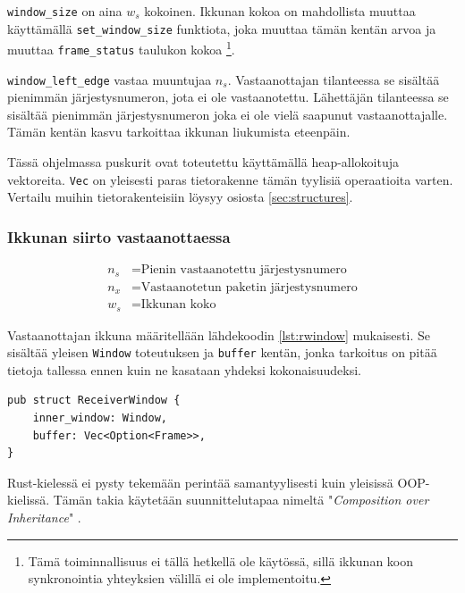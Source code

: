 \documentclass[a4paper,12pt]{article}
\begin{document}
\lstinline{window_size} on aina $w_s$ kokoinen. Ikkunan kokoa on mahdollista muuttaa käyttämällä \lstinline{set_window_size} funktiota, joka muuttaa tämän kentän arvoa ja muuttaa \lstinline{frame_status} taulukon kokoa \footnote{Tämä toiminnallisuus ei tällä hetkellä ole käytössä, sillä ikkunan koon synkronointia yhteyksien välillä ei ole implementoitu.}.\par

\lstinline{window_left_edge} vastaa muuntujaa $n_s$. Vastaanottajan tilanteessa se sisältää pienimmän järjestysnumeron, jota ei ole vastaanotettu. Lähettäjän tilanteessa se sisältää pienimmän järjestysnumeron joka ei ole vielä saapunut vastaanottajalle. Tämän kentän kasvu tarkoittaa ikkunan liukumista eteenpäin. 



    Tässä ohjelmassa puskurit ovat toteutettu käyttämällä heap-allokoituja vektoreita. \lstinline{Vec} on yleisesti paras tietorakenne tämän tyylisiä operaatioita varten. Vertailu muihin tietorakenteisiin löysyy osiosta \ref{sec:structures}.

    \subsubsection{Ikkunan siirto vastaanottaessa}

    \begin{align}
        n_s &= \text{Pienin vastaanotettu järjestysnumero} \\
        n_x &= \text{Vastaanotetun paketin järjestysnumero} \\
        w_s &= \text{Ikkunan koko}
    \end{align}



    Vastaanottajan ikkuna määritellään lähdekoodin \ref{lst:rwindow} mukaisesti. Se sisältää yleisen \lstinline{Window} toteutuksen ja \lstinline{buffer} kentän, jonka tarkoitus on pitää tietoja
    tallessa ennen kuin ne kasataan yhdeksi kokonaisuudeksi. \par
    
\begin{lstlisting}[caption={Vastaanottajan ikkunan rakenne}, label={lst:rwindow}]
pub struct ReceiverWindow {
    inner_window: Window,
    buffer: Vec<Option<Frame>>,
}\end{lstlisting}

    \begin{framed}
        Rust-kielessä ei pysty tekemään perintää samantyylisesti kuin yleisissä OOP-kielissä. Tämän takia
        käytetään suunnittelutapaa nimeltä "\textit{Composition over Inheritance}" \cite{Ivicevic202228Inheritance}.
    \end{framed}
\end{document}
